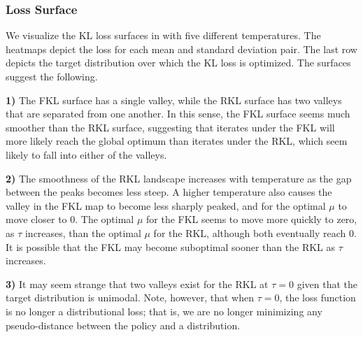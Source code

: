 \documentclass[twoside,11pt]{article}
\newcommand{\myparagraph}[1]{\textbf{#1} \ \ \ }
\begin{document}
\subsubsection{Loss Surface}
We visualize the KL loss surfaces in  with five different temperatures. The heatmaps depict the loss for each mean and standard deviation pair. The last row depicts the target distribution over which the KL loss is optimized. The surfaces suggest the following. 

\textbf{1)} The FKL surface has a single valley, while the RKL surface has two valleys that are separated from one another. In this sense, the FKL surface seems much smoother than the RKL surface, suggesting that iterates under the FKL will more likely reach the global optimum than iterates under the RKL, which seem likely to fall into either of the valleys. 

\textbf{2)} The smoothness of the RKL landscape increases with temperature as the gap between the peaks becomes less steep. A higher temperature also causes the valley in the FKL map to become less sharply peaked, and for the optimal $\mu$ to move closer to 0. The optimal $\mu$ for the FKL seems to move more quickly to zero, as $\tau$ increases, than the optimal $\mu$ for the RKL, although both eventually reach 0. It is possible that the FKL may become suboptimal sooner than the RKL as $\tau$ increases. 

\textbf{3)} It may seem strange that two valleys exist for the RKL at $\tau = 0$ given that the target distribution is unimodal. Note, however, that when $\tau = 0$, the loss function is no longer a distributional loss; that is, we are no longer minimizing any pseudo-distance between the policy and a distribution. 



\end{document}
